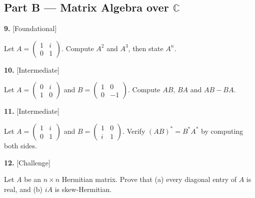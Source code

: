 \documentclass[11pt]{article}
\begin{document}
\subsection*{\normalsize\color{ink} Part B --- Matrix Algebra over $\mathbb{C}$}
\begin{minipage}{\linewidth}\textbf{9.} \hfill{\scriptsize\color{ink}[Foundational]}\par\nopagebreak Let $A=\begin{pmatrix}1&i\\0&1\end{pmatrix}$. Compute $A^{2}$ and $A^{3}$, then state $A^{n}$.
\vspace{3.4cm}\end{minipage}\par\vspace{4pt}
\begin{minipage}{\linewidth}\textbf{10.} \hfill{\scriptsize\color{ink}[Intermediate]}\par\nopagebreak Let $A=\begin{pmatrix}0&i\\1&0\end{pmatrix}$ and $B=\begin{pmatrix}1&0\\0&-1\end{pmatrix}$. Compute $AB$, $BA$ and $AB-BA$.
\vspace{4.0cm}\end{minipage}\par\vspace{4pt}
\begin{minipage}{\linewidth}\textbf{11.} \hfill{\scriptsize\color{ink}[Intermediate]}\par\nopagebreak Let $A=\begin{pmatrix}1&i\\0&1\end{pmatrix}$ and $B=\begin{pmatrix}1&0\\i&1\end{pmatrix}$. Verify $(AB)^{*}=B^{*}A^{*}$ by computing both sides.
\vspace{4.4cm}\end{minipage}\par\vspace{4pt}
\begin{minipage}{\linewidth}\textbf{12.} \hfill{\scriptsize\color{ink}[Challenge]}\par\nopagebreak Let $A$ be an $n\times n$ Hermitian matrix. Prove that (a) every diagonal entry of $A$ is real, and (b) $iA$ is skew-Hermitian.
\vspace{4.6cm}\end{minipage}\par\vspace{4pt}
\end{document}
